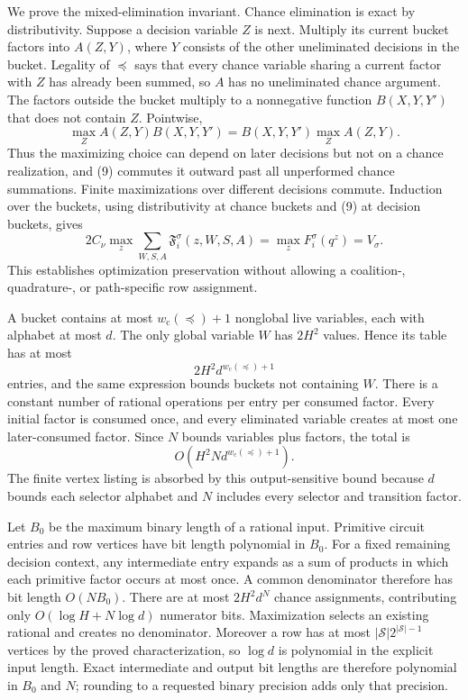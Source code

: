 We prove the mixed-elimination invariant.  Chance elimination is exact by distributivity.  Suppose a decision variable \(Z\) is next.  Multiply its current bucket factors into \(A(Z,Y)\), where \(Y\) consists of the other uneliminated decisions in the bucket.  Legality of \(\preceq\) says that every chance variable sharing a current factor with \(Z\) has already been summed, so \(A\) has no uneliminated chance argument.  The factors outside the bucket multiply to a nonnegative function \(B(X,Y,Y')\) that does not contain \(Z\).  Pointwise,
\[
 \max_Z A(Z,Y)B(X,Y,Y')=B(X,Y,Y')\max_ZA(Z,Y). \tag{9}
\]
Thus the maximizing choice can depend on later decisions but not on a chance realization, and (9) commutes it outward past all unperformed chance summations.  Finite maximizations over different decisions commute.  Induction over the buckets, using distributivity at chance buckets and (9) at decision buckets, gives
\[
 2C_\nu\max_z\sum_{W,S,A}\mathfrak F_i^\sigma(z,W,S,A)
 =\max_zF_i^\sigma(q^z)=V_\sigma. \tag{10}
\]
This establishes optimization preservation without allowing a coalition-, quadrature-, or path-specific row assignment.

A bucket contains at most \(w_{\mathrm c}(\preceq)+1\) nonglobal live variables, each with alphabet at most \(d\).  The only global variable \(W\) has \(2H^2\) values.  Hence its table has at most
\[
 2H^2d^{w_{\mathrm c}(\preceq)+1} \tag{11}
\]
entries, and the same expression bounds buckets not containing \(W\).  There is a constant number of rational operations per entry per consumed factor.  Every initial factor is consumed once, and every eliminated variable creates at most one later-consumed factor.  Since \(N\) bounds variables plus factors, the total is
\[
 O\!\left(H^2N d^{w_{\mathrm c}(\preceq)+1}\right). \tag{12}
\]
The finite vertex listing is absorbed by this output-sensitive bound because \(d\) bounds each selector alphabet and \(N\) includes every selector and transition factor.

Let \(B_0\) be the maximum binary length of a rational input.  Primitive circuit entries and row vertices have bit length polynomial in \(B_0\).  For a fixed remaining decision context, any intermediate entry expands as a sum of products in which each primitive factor occurs at most once.  A common denominator therefore has bit length \(O(NB_0)\).  There are at most \(2H^2d^N\) chance assignments, contributing only \(O(\log H+N\log d)\) numerator bits.  Maximization selects an existing rational and creates no denominator.  Moreover a row has at most \(|\mathcal S|2^{|\mathcal S|-1}\) vertices by the proved characterization, so \(\log d\) is polynomial in the explicit input length.  Exact intermediate and output bit lengths are therefore polynomial in \(B_0\) and \(N\); rounding to a requested binary precision adds only that precision.

